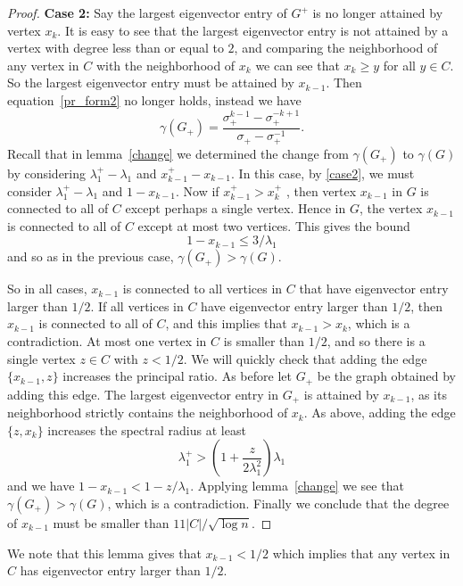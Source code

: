 \begin{proof}
  \noindent \textbf{Case 2:} Say the largest eigenvector entry of $G^+$ is no
  longer attained by vertex $x_k$.  It is easy to see that the largest
  eigenvector entry is not attained by a vertex with degree less than or equal
  to $2$, and comparing the neighborhood of any vertex in $C$ with the neighborhood
  of $x_{k}$ we can see that $x_k \geq y$ for all $y \in C.$  So the
  largest eigenvector entry must be attained by $x_{k-1}$.
  Then equation~\ref{pr_form2} no longer holds, instead we have
   \begin{equation}\label{case2} \gamma(G_+) = \frac{\sigma_+^{k-1} - \sigma_+^{-k+1}}{\sigma_+ - \sigma_+^{-1}} .\end{equation}
Recall that in lemma~\ref{change} we determined the change from $\gamma(G_+)$ to $\gamma(G)$ by considering $\lambda^+_1 - \lambda_1$ and $x^+_{k-1}-x_{k-1}$. In this case, by \eqref{case2}, we must consider $\lambda^+_1 - \lambda_1$ and $1-x_{k-1}$.
   Now if  $x_{k-1}^+ > x_k^+$ , then vertex $x_{k-1}$ in $G$
  is connected
  to all of $C$ except perhaps a single vertex.  Hence
  in $G$, the vertex $x_{k-1}$ is connected to all of $C$ except at most
  two vertices.  This gives the bound
   \[ 1 - x_{k-1} \leq 3 / \lambda_1 \]
  and so as in the previous case, $\gamma(G_+) > \gamma(G)$.


  So in all cases, $x_{k-1}$ is connected to all vertices in $C$ that have
  eigenvector entry larger than $1/2$.  If all vertices in $C$ have eigenvector
  entry larger than $1/2$, then $x_{k-1}$ is connected to all of $C$,
  and this implies that $x_{k-1} > x_k$, which is a contradiction.
  At most one vertex in $C$ is smaller than $1/2$, and so
  there is a single vertex $z \in C$ with $z < 1/2$.  We will
  quickly check that adding the edge $\{ x_{k-1}, z\}$ increases
  the principal ratio.  As before let $G_+$ be the graph obtained by
  adding this edge.  The largest eigenvector entry in $G_+$ is
  attained by $x_{k-1}$, as its neighborhood strictly contains the neighborhood
  of $x_{k}$.  
  As above, adding the edge $\{ z, x_{k}\}$ increases the spectral radius
  at least
   \[ \lambda_1^+ > \left(1 + \frac{z}{2\lambda_1^2} \right) \lambda_1 \]
  and we have $1 - x_{k-1} < 1 - z/\lambda_1$.  Applying lemma~\ref{change}
  we see that $\gamma(G_+) > \gamma(G)$, which is a contradiction.
  Finally we conclude that the degree of $x_{k-1}$ must be smaller than
  $11 |C| / \sqrt{\log n}$.
\end{proof}

We note that this lemma gives that $x_{k-1} < 1/2$ which implies that any vertex in $C$ has eigenvector entry larger than $1/2$.

